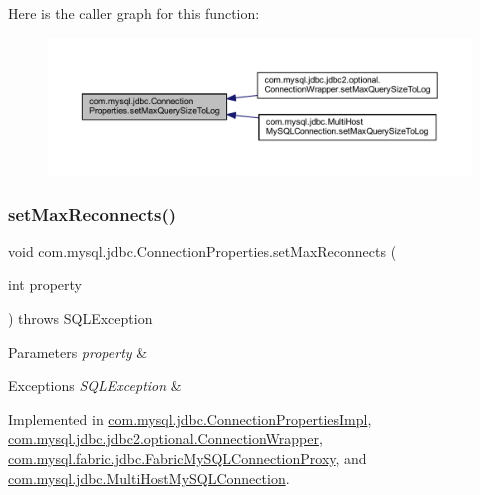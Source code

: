 Here is the caller graph for this function\+:\nopagebreak
\begin{figure}[H]
\begin{center}
\leavevmode
\includegraphics[width=350pt]{interfacecom_1_1mysql_1_1jdbc_1_1_connection_properties_a65e15e4e1644fe1fb818777977237944_icgraph}
\end{center}
\end{figure}
\mbox{\label{interfacecom_1_1mysql_1_1jdbc_1_1_connection_properties_aa4dbdf7b74fc014b67992de0cf9247c9}} 
\subsubsection{\texorpdfstring{set\+Max\+Reconnects()}{setMaxReconnects()}}
{\footnotesize\ttfamily void com.\+mysql.\+jdbc.\+Connection\+Properties.\+set\+Max\+Reconnects (\begin{DoxyParamCaption}\item[{int}]{property }\end{DoxyParamCaption}) throws S\+Q\+L\+Exception}


\begin{DoxyParams}{Parameters}
{\em property} & \\
\hline
\end{DoxyParams}

\begin{DoxyExceptions}{Exceptions}
{\em S\+Q\+L\+Exception} & \\
\hline
\end{DoxyExceptions}


Implemented in \mbox{\hyperlink{classcom_1_1mysql_1_1jdbc_1_1_connection_properties_impl_a240be4b60c27f02489e6b7b0b50a7e8a}{com.\+mysql.\+jdbc.\+Connection\+Properties\+Impl}}, \mbox{\hyperlink{classcom_1_1mysql_1_1jdbc_1_1jdbc2_1_1optional_1_1_connection_wrapper_aeed825d6bd8942b00610c43d8a8c82ef}{com.\+mysql.\+jdbc.\+jdbc2.\+optional.\+Connection\+Wrapper}}, \mbox{\hyperlink{classcom_1_1mysql_1_1fabric_1_1jdbc_1_1_fabric_my_s_q_l_connection_proxy_a1180c8ed7ee4dd067add13f5f7d096e4}{com.\+mysql.\+fabric.\+jdbc.\+Fabric\+My\+S\+Q\+L\+Connection\+Proxy}}, and \mbox{\hyperlink{classcom_1_1mysql_1_1jdbc_1_1_multi_host_my_s_q_l_connection_a3f763d84919c40ae00d9d76bc53ac78e}{com.\+mysql.\+jdbc.\+Multi\+Host\+My\+S\+Q\+L\+Connection}}.


